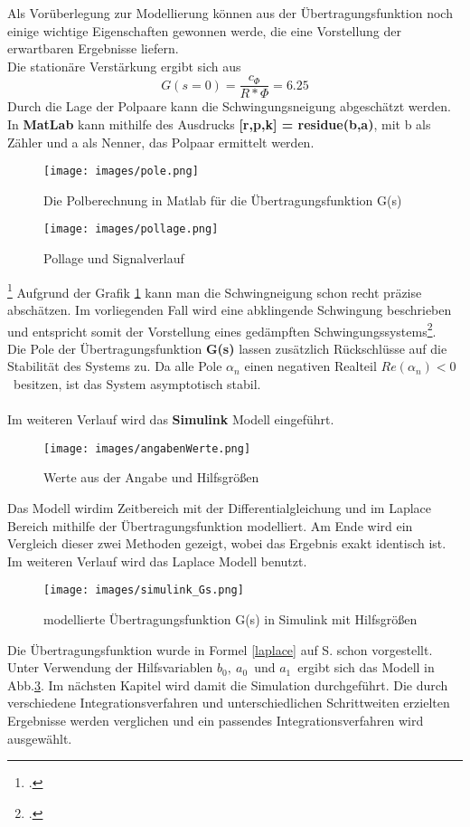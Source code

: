\documentclass[12pt,a4paper]{scrartcl}	%
\begin{document}
Als Vorüberlegung zur Modellierung können aus der Übertragungsfunktion noch einige wichtige Eigenschaften gewonnen werde, die eine Vorstellung der erwartbaren Ergebnisse liefern.\\
Die stationäre Verstärkung ergibt sich aus 
\[  G(s=0) = {\frac{c_\Phi}{R* \Phi}} = 6.25 \]
Durch die Lage der Polpaare kann die Schwingungsneigung abgeschätzt werden. In \textbf{MatLab} kann mithilfe des Ausdrucks \textbf{[r,p,k] = residue(b,a)}, mit b als Zähler und a als Nenner, das Polpaar ermittelt werden.
\begin{figure}[htb]
	\centering
	\texttt{[image: images/pole.png]}
	\caption{Die Polberechnung in Matlab für die Übertragungsfunktion G(s)}
\end{figure}
\begin{figure}[htb]
	\centering
	\texttt{[image: images/pollage.png]}
	\caption[Pollage und Signalverlauf]{Pollage und Signalverlauf\footnotemark} 
	\label{pollage}
\end{figure}
\footcitetext[vgl.][Abruf am 21.08.2018]{hoch}
Aufgrund der Grafik \ref{pollage} kann man die Schwingneigung schon recht präzise abschätzen. 			
Im vorliegenden Fall wird eine abklingende Schwingung beschrieben und entspricht somit der Vorstellung eines gedämpften Schwingungssystems\footcite[vgl.][Abruf am 18.08.2018]{hoch}.\\
Die Pole der Übertragungsfunktion \textbf{G(s)} lassen zusätzlich Rückschlüsse auf die Stabilität des Systems zu. Da alle Pole $\alpha_{n}$ einen negativen Realteil $Re(\alpha_{n}) < 0$~besitzen, ist das System asymptotisch stabil.\\
\\
Im weiteren Verlauf wird das \textbf{Simulink} Modell eingeführt.
\begin{figure}[htb]
	\centering
	\texttt{[image: images/angabenWerte.png]}
	\caption{Werte aus der Angabe und Hilfsgrößen}
	\label{werte}
\end{figure}
Das Modell wirdim Zeitbereich mit der Differentialgleichung und im Laplace Bereich mithilfe der Übertragungsfunktion modelliert. Am Ende wird ein Vergleich dieser zwei Methoden gezeigt, wobei das Ergebnis exakt identisch ist. Im weiteren Verlauf wird das Laplace Modell benutzt.
\begin{figure}[htb]
	\centering
	\texttt{[image: images/simulink\_Gs.png]}
	\caption{modellierte Übertragungsfunktion G(s) in Simulink mit Hilfsgrößen}
	\label{simu}
\end{figure}
Die Übertragungsfunktion wurde in Formel \ref{laplace} auf S. \pageref{laplace} schon vorgestellt. Unter Verwendung der Hilfsvariablen $b_{0},~a_{0}$~und $a_{1}$~ergibt sich das Modell in Abb.\ref{simu}.
Im nächsten Kapitel wird damit die Simulation durchgeführt. Die durch verschiedene Integrationsverfahren und unterschiedlichen Schrittweiten erzielten Ergebnisse werden verglichen und ein passendes Integrationsverfahren wird ausgewählt.
\end{document}

